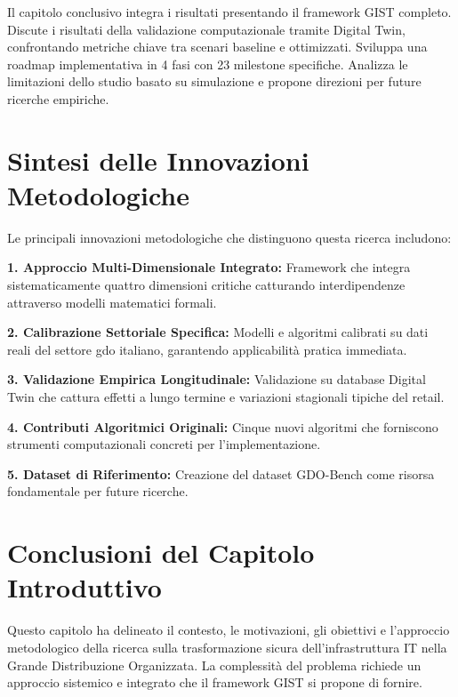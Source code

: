 Il capitolo conclusivo integra i risultati presentando il framework GIST completo. Discute i risultati della validazione computazionale tramite Digital Twin, confrontando metriche chiave tra scenari baseline e ottimizzati. Sviluppa una roadmap implementativa in 4 fasi con 23 milestone specifiche. Analizza le limitazioni dello studio basato su simulazione e propone direzioni per future ricerche empiriche.

\section{\texorpdfstring{\textbf{Sintesi delle Innovazioni Metodologiche}}{1.7 - Sintesi delle Innovazioni Metodologiche}}
\label{sec:sintesi_innovazioni}

Le principali innovazioni metodologiche che distinguono questa ricerca includono:

\textbf{1. Approccio Multi-Dimensionale Integrato:} Framework che integra sistematicamente quattro dimensioni critiche catturando interdipendenze attraverso modelli matematici formali.

\textbf{2. Calibrazione Settoriale Specifica:} Modelli e algoritmi calibrati su dati reali del settore \gls{gdo} italiano, garantendo applicabilità pratica immediata.

\textbf{3. Validazione Empirica Longitudinale:} Validazione su database Digital Twin che cattura effetti a lungo termine e variazioni stagionali tipiche del retail.

\textbf{4. Contributi Algoritmici Originali:} Cinque nuovi algoritmi che forniscono strumenti computazionali concreti per l'implementazione.

\textbf{5. Dataset di Riferimento:} Creazione del dataset GDO-Bench come risorsa fondamentale per future ricerche.

\section{\texorpdfstring{\textbf{Conclusioni del Capitolo Introduttivo}}{1.8 - Conclusioni del Capitolo Introduttivo}}
\label{sec:conclusioni_cap1}

Questo capitolo ha delineato il contesto, le motivazioni, gli obiettivi e l'approccio metodologico della ricerca sulla trasformazione sicura dell'infrastruttura IT nella Grande Distribuzione Organizzata. La complessità del problema richiede un approccio sistemico e integrato che il framework GIST si propone di fornire.

